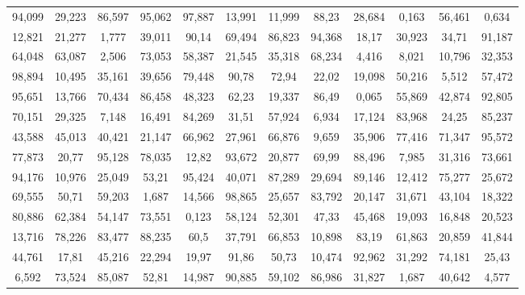 \documentclass[border=0.5cm]{standalone}
\begin{document}
\begin{tabular}{SSSSSSSSSSSS}
94,099	&	29,223	&	86,597	&	95,062	&	97,887	&	13,991	&	11,999	&	88,23	&	28,684	&	0,163	&	56,461	&	0,634	\\
12,821	&	21,277	&	1,777	&	39,011	&	90,14	&	69,494	&	86,823	&	94,368	&	18,17	&	30,923	&	34,71	&	91,187	\\
64,048	&	63,087	&	2,506	&	73,053	&	58,387	&	21,545	&	35,318	&	68,234	&	4,416	&	8,021	&	10,796	&	32,353	\\
98,894	&	10,495	&	35,161	&	39,656	&	79,448	&	90,78	&	72,94	&	22,02	&	19,098	&	50,216	&	5,512	&	57,472	\\
95,651	&	13,766	&	70,434	&	86,458	&	48,323	&	62,23	&	19,337	&	86,49	&	0,065	&	55,869	&	42,874	&	92,805	\\
70,151	&	29,325	&	7,148	&	16,491	&	84,269	&	31,51	&	57,924	&	6,934	&	17,124	&	83,968	&	24,25	&	85,237	\\
43,588	&	45,013	&	40,421	&	21,147	&	66,962	&	27,961	&	66,876	&	9,659	&	35,906	&	77,416	&	71,347	&	95,572	\\
77,873	&	20,77	&	95,128	&	78,035	&	12,82	&	93,672	&	20,877	&	69,99	&	88,496	&	7,985	&	31,316	&	73,661	\\
94,176	&	10,976	&	25,049	&	53,21	&	95,424	&	40,071	&	87,289	&	29,694	&	89,146	&	12,412	&	75,277	&	25,672	\\
69,555	&	50,71	&	59,203	&	1,687	&	14,566	&	98,865	&	25,657	&	83,792	&	20,147	&	31,671	&	43,104	&	18,322	\\
80,886	&	62,384	&	54,147	&	73,551	&	0,123	&	58,124	&	52,301	&	47,33	&	45,468	&	19,093	&	16,848	&	20,523	\\
13,716	&	78,226	&	83,477	&	88,235	&	60,5	&	37,791	&	66,853	&	10,898	&	83,19	&	61,863	&	20,859	&	41,844	\\
44,761	&	17,81	&	45,216	&	22,294	&	19,97	&	91,86	&	50,73	&	10,474	&	92,962	&	31,292	&	74,181	&	25,43	\\
6,592	&	73,524	&	85,087	&	52,81	&	14,987	&	90,885	&	59,102	&	86,986	&	31,827	&	1,687	&	40,642	&	4,577	\\
\end{tabular}
\end{document}
